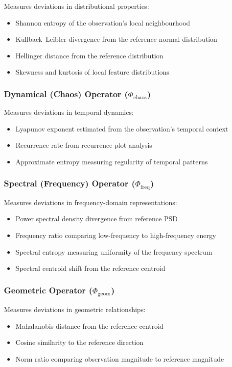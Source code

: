 \documentclass[12pt,a4paper]{article}
\begin{document}
Measures deviations in distributional properties:
\begin{itemize}
\item Shannon entropy of the observation's local neighbourhood
\item Kullback--Leibler divergence from the reference normal distribution
\item Hellinger distance from the reference distribution
\item Skewness and kurtosis of local feature distributions
\end{itemize}

\subsubsection{Dynamical (Chaos) Operator ($\Phi_{\text{chaos}}$)}

Measures deviations in temporal dynamics:
\begin{itemize}
\item Lyapunov exponent estimated from the observation's temporal context
\item Recurrence rate from recurrence plot analysis
\item Approximate entropy measuring regularity of temporal patterns
\end{itemize}

\subsubsection{Spectral (Frequency) Operator ($\Phi_{\text{freq}}$)}

Measures deviations in frequency-domain representations:
\begin{itemize}
\item Power spectral density divergence from reference PSD
\item Frequency ratio comparing low-frequency to high-frequency energy
\item Spectral entropy measuring uniformity of the frequency spectrum
\item Spectral centroid shift from the reference centroid
\end{itemize}

\subsubsection{Geometric Operator ($\Phi_{\text{geom}}$)}

Measures deviations in geometric relationships:
\begin{itemize}
\item Mahalanobis distance from the reference centroid
\item Cosine similarity to the reference direction
\item Norm ratio comparing observation magnitude to reference magnitude
\end{itemize}
\end{document}
